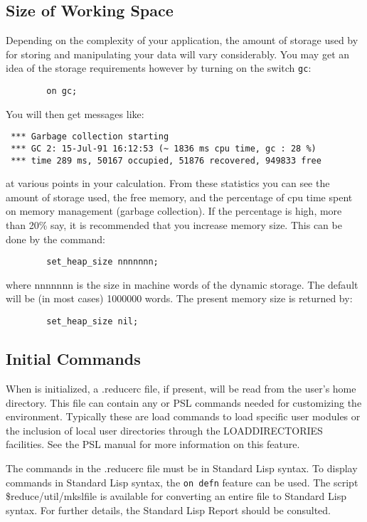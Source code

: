 \subsection{Size of Working Space} Depending on the complexity
of your application, the amount of storage
used by {\REDUCE} for storing and manipulating your data will vary
considerably. You may get an idea of the storage requirements however by
turning on the switch {\tt gc}:
\begin{verbatim}
        on gc;
\end{verbatim}
You will then get messages like:
\begin{verbatim}
 *** Garbage collection starting
 *** GC 2: 15-Jul-91 16:12:53 (~ 1836 ms cpu time, gc : 28 %)
 *** time 289 ms, 50167 occupied, 51876 recovered, 949833 free
\end{verbatim}
at various points in your calculation.
From these statistics you can see the amount of storage used, the
free memory, and the percentage of cpu time spent on
memory management (garbage collection). If the percentage is high, more
than 20\% say, it is recommended that you increase memory size.
This can be done by the command:
\begin{verbatim}
        set_heap_size nnnnnnn;
\end{verbatim}
where nnnnnnn is the size in machine words of the dynamic storage.
The default will be (in most cases) 1000000 words. The present memory size
is returned by:
\begin{verbatim}
        set_heap_size nil;
\end{verbatim}

\subsection{Initial Commands} When {\REDUCE} is initialized,
a .reducerc file, if present, will be read
from the user's home directory.  This file can contain any {\REDUCE} or
PSL commands needed for customizing the {\REDUCE} environment.  Typically
these are load commands to load specific user modules or the inclusion
of local user directories through the LOADDIRECTORIES facilities.  See the
PSL manual for more information on this feature.

The commands in the .reducerc file must be in Standard Lisp syntax.  To
display {\REDUCE} commands in Standard Lisp syntax, the {\REDUCE} {\tt on
defn} feature can be used.  The script \$reduce/util/mkslfile is available
for converting an entire file to Standard Lisp syntax.  For further
details, the Standard Lisp Report should be consulted.

